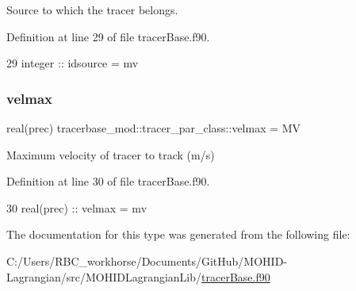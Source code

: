 Source to which the tracer belongs. 



Definition at line 29 of file tracer\+Base.\+f90.


\begin{DoxyCode}
29         \textcolor{keywordtype}{integer} :: idsource = mv                 
\end{DoxyCode}
\mbox{\label{structtracerbase__mod_1_1tracer__par__class_aed66c62e3a6b58b622db19c61665efbf}} 
\subsubsection{\texorpdfstring{velmax}{velmax}}
{\footnotesize\ttfamily real(prec) tracerbase\+\_\+mod\+::tracer\+\_\+par\+\_\+class\+::velmax = MV\hspace{0.3cm}{\ttfamily [private]}}



Maximum velocity of tracer to track (m/s) 



Definition at line 30 of file tracer\+Base.\+f90.


\begin{DoxyCode}
30         \textcolor{keywordtype}{real(prec)} :: velmax = mv                
\end{DoxyCode}


The documentation for this type was generated from the following file\+:\begin{DoxyCompactItemize}
\item 
C\+:/\+Users/\+R\+B\+C\+\_\+workhorse/\+Documents/\+Git\+Hub/\+M\+O\+H\+I\+D-\/\+Lagrangian/src/\+M\+O\+H\+I\+D\+Lagrangian\+Lib/\mbox{\hyperlink{tracer_base_8f90}{tracer\+Base.\+f90}}\end{DoxyCompactItemize}
